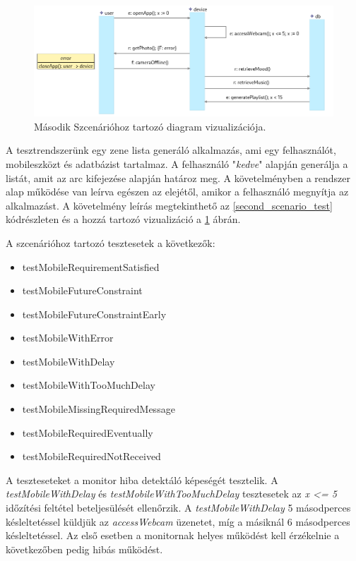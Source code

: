 \begin{figure}[!ht]
    \centering
    \includegraphics[width=150mm, keepaspectratio]{figures/diagramMobileExample.png}
    \caption{Második Szcenárióhoz tartozó diagram vizualizációja.}
    \label{second_visualization}
\end{figure}

A tesztrendszerünk egy zene lista generáló alkalmazás, ami egy felhasználót, mobileszközt és adatbázist tartalmaz.
A felhasználó "\textit{kedve}" alapján generálja a listát, amit az arc kifejezése alapján határoz meg.
A követelményben a rendszer alap működése van leírva egészen az elejétől, amikor a felhasználó megnyítja az alkalmazást.
A követelmény leírás megtekinthető az \ref{second_scenario_test} kódrészleten és a hozzá tartozó vizualizáció a \ref{second_visualization} ábrán.

A szcenárióhoz tartozó tesztesetek a következők:

\begin{itemize}
    \item testMobileRequirementSatisfied
    \item testMobileFutureConstraint
    \item testMobileFutureConstraintEarly
    \item testMobileWithError
    \item testMobileWithDelay
    \item testMobileWithTooMuchDelay
    \item testMobileMissingRequiredMessage
    \item testMobileRequiredEventually
    \item testMobileRequiredNotReceived
\end{itemize}

A teszteseteket a monitor hiba detektáló képeségét tesztelik.
A \textit{testMobileWithDelay} és \textit{testMobileWithTooMuchDelay} tesztesetek az \textit{x <= 5} időzítési feltétel beteljesülését ellenőrzik.
A \textit{testMobileWithDelay} 5 másodperces késleltetéssel küldjük az \textit{accessWebcam} üzenetet, míg a másiknál 6 másodperces késleltetéssel.
Az első esetben a monitornak helyes működést kell érzékelnie a következőben pedig hibás működést.

